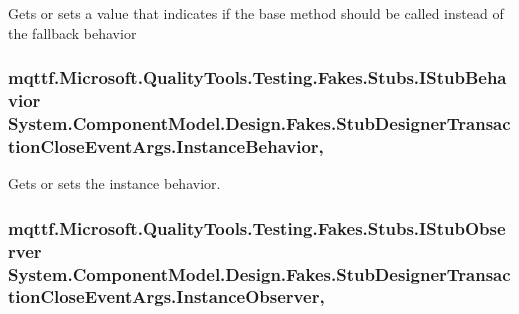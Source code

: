 Gets or sets a value that indicates if the base method should be called instead of the fallback behavior

\hypertarget{class_system_1_1_component_model_1_1_design_1_1_fakes_1_1_stub_designer_transaction_close_event_args_a0cc9bdfb721d69e4c8e7ac9d713e4b68}{
\subsubsection[{Instance\-Behavior}]{\setlength{\rightskip}{0pt plus 5cm}mqttf.\-Microsoft.\-Quality\-Tools.\-Testing.\-Fakes.\-Stubs.\-I\-Stub\-Behavior System.\-Component\-Model.\-Design.\-Fakes.\-Stub\-Designer\-Transaction\-Close\-Event\-Args.\-Instance\-Behavior\hspace{0.3cm}{\ttfamily [get]}, {\ttfamily [set]}}}\label{class_system_1_1_component_model_1_1_design_1_1_fakes_1_1_stub_designer_transaction_close_event_args_a0cc9bdfb721d69e4c8e7ac9d713e4b68}


Gets or sets the instance behavior.

\hypertarget{class_system_1_1_component_model_1_1_design_1_1_fakes_1_1_stub_designer_transaction_close_event_args_af3e32db35be9ad10ab650add9ed57b01}{
\subsubsection[{Instance\-Observer}]{\setlength{\rightskip}{0pt plus 5cm}mqttf.\-Microsoft.\-Quality\-Tools.\-Testing.\-Fakes.\-Stubs.\-I\-Stub\-Observer System.\-Component\-Model.\-Design.\-Fakes.\-Stub\-Designer\-Transaction\-Close\-Event\-Args.\-Instance\-Observer\hspace{0.3cm}{\ttfamily [get]}, {\ttfamily [set]}}}\label{class_system_1_1_component_model_1_1_design_1_1_fakes_1_1_stub_designer_transaction_close_event_args_af3e32db35be9ad10ab650add9ed57b01}


